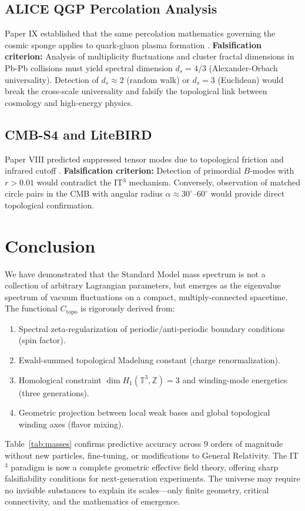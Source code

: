 \documentclass[12pt,a4paper]{article}
\begin{document}
\subsection{ALICE QGP Percolation Analysis}
Paper IX established that the same percolation mathematics governing the cosmic sponge applies to quark-gluon plasma formation \cite{PaperIX}. 
\textbf{Falsification criterion:} Analysis of multiplicity fluctuations and cluster fractal dimensions in Pb-Pb collisions must yield spectral dimension $d_s = 4/3$ (Alexander-Orbach universality). Detection of $d_s \approx 2$ (random walk) or $d_s = 3$ (Euclidean) would break the cross-scale universality and falsify the topological link between cosmology and high-energy physics.

\subsection{CMB-S4 and LiteBIRD}
Paper VIII predicted suppressed tensor modes due to topological friction and infrared cutoff \cite{PaperVIII}.
\textbf{Falsification criterion:} Detection of primordial $B$-modes with $r > 0.01$ would contradict the IT$^3$ mechanism. Conversely, observation of matched circle pairs in the CMB with angular radius $\alpha \approx 30^\circ$--$60^\circ$ would provide direct topological confirmation.

\section{Conclusion}
We have demonstrated that the Standard Model mass spectrum is not a collection of arbitrary Lagrangian parameters, but emerges as the eigenvalue spectrum of vacuum fluctuations on a compact, multiply-connected spacetime. The functional $C_{\text{topo}}$ is rigorously derived from:
\begin{enumerate}
    \item Spectral zeta-regularization of periodic/anti-periodic boundary conditions (spin factor).
    \item Ewald-summed topological Madelung constant (charge renormalization).
    \item Homological constraint $\dim H_1(\mathbb{T}^3,\mathbb{Z}) = 3$ and winding-mode energetics (three generations).
    \item Geometric projection between local weak bases and global topological winding axes (flavor mixing).
\end{enumerate}
Table~\ref{tab:masses} confirms predictive accuracy across 9 orders of magnitude without new particles, fine-tuning, or modifications to General Relativity. The IT$^3$ paradigm is now a complete geometric effective field theory, offering sharp falsifiability conditions for next-generation experiments. The universe may require no invisible substances to explain its scales—only finite geometry, critical connectivity, and the mathematics of emergence.
\end{document}
